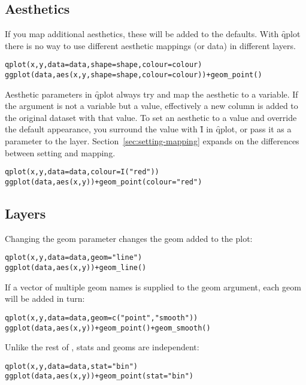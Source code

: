 \subsection{Aesthetics}

If you map additional aesthetics, these will be added to the defaults.  With \f{qplot} there is no way to use different aesthetic mappings (or data) in different layers.

\begin{alltt}
qplot(x, y, data = data, shape = shape, colour = colour)
ggplot(data, aes(x, y, shape = shape, colour = colour)) + geom_point()
\end{alltt}

Aesthetic parameters in \f{qplot} always try and map the aesthetic to a variable.  If the argument is not a variable but a value, effectively a new column is added to the original dataset with that value.  To set an aesthetic to a value and override the default appearance, you surround the value with \f{I} in \f{qplot}, or pass it as a parameter to the layer.  Section~\ref{sec:setting-mapping} expands on the differences between setting and mapping.

\begin{alltt}
qplot(x, y, data = data, colour = I("red"))
ggplot(data, aes(x, y)) + geom_point(colour = "red")
\end{alltt}

\subsection{Layers}

Changing the geom parameter changes the geom added to the plot:

\begin{alltt}
qplot(x, y, data = data, geom = "line")
ggplot(data, aes(x, y)) + geom_line()
\end{alltt}

If a vector of multiple geom names is supplied to the geom argument, each geom will be added in turn:

\begin{alltt}
qplot(x, y, data = data, geom = c("point", "smooth"))
ggplot(data, aes(x, y)) + geom_point() + geom_smooth()
\end{alltt}

Unlike the rest of \ggplot, stats and geoms are independent:

\begin{alltt}
qplot(x, y, data = data, stat = "bin")
ggplot(data, aes(x, y)) + geom_point(stat = "bin")  
\end{alltt}


